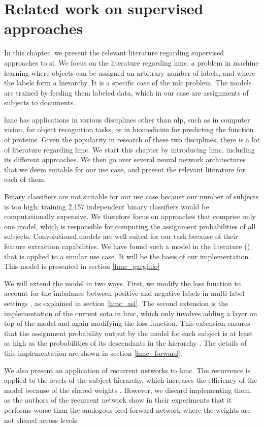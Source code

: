 \section{Related work on supervised approaches} \label{hmc}

In this chapter, we present the relevant literature regarding supervised approaches to \acrfull{si}. We focus on the literature regarding \acrfull{hmc}, a problem in machine learning where objects can be assigned an arbitrary number of labels, and where the labels form a hierarchy. It is a specific case of the \acrfull{mlc} problem. The models are trained by feeding them labeled data, which in our case are assignments of subjects to documents.

\acrshort{hmc} has applications in various disciplines other than \acrfull{nlp}, such as in computer vision, for object recognition tasks, or in biomedicine for predicting the function of proteins. Given the popularity in research of these two disciplines, there is a lot of literature regarding \acrshort{hmc}. We start this chapter by introducing \acrshort{hmc}, including its different approaches. We then go over several neural network architectures that we deem suitable for our use case, and present the relevant literature for each of them.

Binary classifiers are not suitable for our use case because our number of subjects is too high: training 2,157 independent binary classifiers would be computationally expensive. We therefore focus on approaches that comprise only one model, which is responsible for computing the assignment probabilities of all subjects. Convolutional models are well suited for our task because of their feature extraction capabilities. We have found such a model in the literature (\cite{gargiulo2019deep}) that is applied to a similar use case. It will be the basis of our implementation. This model is presented in section \ref{hmc_gargiulo}

We will extend the model in two ways. First, we modify the loss function to account for the imbalance between positive and negative labels in multi-label settings \cite{ben2020asymmetric}, as explained in section \ref{hmc_asl}. The second extension is the implementation of the current \acrshort{sota} in \acrshort{hmc}, which only involves adding a layer on top of the model and again modifying the loss function. This extension ensures that the assignment probability output by the model for each subject is at least as high as the probabilities of its descendants in the hierarchy \cite{giunchiglia2020coherent}. The details of this implementation are shown in section \ref{hmc_forward}.

We also present an application of recurrent networks to \acrshort{hmc}. The recurrence is applied to the levels of the subject hierarchy, which increases the efficiency of the model because of the shared weights \cite{wehrmann2018hierarchical}. However, we discard implementing them, as the authors of the recurrent network show in their experiments that it performs worse than the analogous feed-forward network where the weights are not shared across levels.






